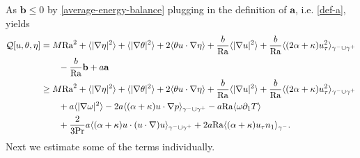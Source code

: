 \documentclass{article}
\theoremstyle{definition}
\theoremstyle{definition}
\newcommand{\Pra}{\rm{Pr}}
\newcommand{\Ra}{{\rm{Ra}}}
\begin{document}
As $\mathbf{b}\leq 0$ by \eqref{average-energy-balance} plugging in the definition of $\mathbf{a}$, i.e. \eqref{def-a}, yields
\begin{equation}
    \label{Q-estimation-1}
    \begin{aligned}
        \mathcal{Q}[u,\theta,\eta]&=M \Ra^2 + \langle |\nabla\eta|^2\rangle + \langle |\nabla \theta|^2\rangle + 2\langle \theta u\cdot\nabla \eta\rangle + \frac{b}{\Ra}\langle |\nabla u|^2\rangle + \frac{b}{\Ra}\langle (2\alpha+\kappa)u_\tau^2\rangle_{\gamma^-\cup\gamma^+}
        \\
        &\qquad - \frac{b}{\Ra}\mathbf{b} + a \mathbf{a}
        \\
        &\geq M \Ra^2 + \langle |\nabla\eta|^2\rangle + \langle |\nabla \theta|^2\rangle + 2\langle \theta u\cdot\nabla \eta\rangle + \frac{b}{\Ra}\langle |\nabla u|^2\rangle + \frac{b}{\Ra}\langle (2\alpha+\kappa)u_\tau^2\rangle_{\gamma^-\cup\gamma^+} 
        \\
        &\qquad + a\langle |\nabla \omega|^2\rangle - 2 a \langle (\alpha+\kappa)u\cdot\nabla p\rangle_{\gamma^-\cup\gamma^+} - a \Ra \langle \omega\partial_1 T\rangle 
        \\
        &\qquad + \frac{2}{3\Pra} a \langle (\alpha+\kappa) u\cdot (u\cdot\nabla) u\rangle_{\gamma^-\cup\gamma^+} + 2 a \Ra \langle (\alpha+\kappa) u_\tau n_1\rangle_{\gamma^-}.
    \end{aligned}
\end{equation}
Next we estimate some of the terms individually. 
\end{document}
